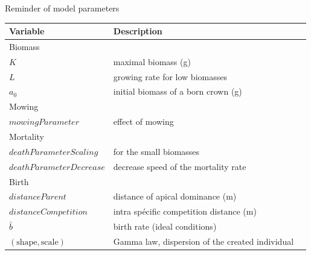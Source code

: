 \documentclass{myBeamer}
\begin{document}
\begin{frame}{Reminder of model parameters}
  \scriptsize
    
\begin{tabular}{lll}
	\hline
   Variable & Description                            \\ %
   	\hline
   Biomass  &                              \\ %
   	\hline
    $K$       &  maximal biomass   (g)    \\ %
    $L$      &  growing rate for low biomasses \\ %
    $a_0$      &  initial  biomass of a born crown (g)  \\ %
       	\hline
   Mowing &                         \\ %
		\hline   
    $mowingParameter$  &  effect of mowing \\  
          \hline
   Mortality &                         \\ 
		\hline
    $deathParameterScaling$  & for the small biomasses \\ %
     $deathParameterDecrease$  &  decrease speed of the mortality rate\\ %
       \hline
  Birth &                           \\ %
		\hline
  $distanceParent$      &  distance of apical dominance (m) \\ %
    $distanceCompetition$       &   intra spécific competition distance (m) \\ %
 	$\bar{b}$    &  birth rate (ideal conditions) \\ %
    $ (\text{shape},\text{scale})$     &   Gamma law, dispersion of the created individual\\ %
     \hline
\end{tabular}
 

\end{frame}
\end{document}
